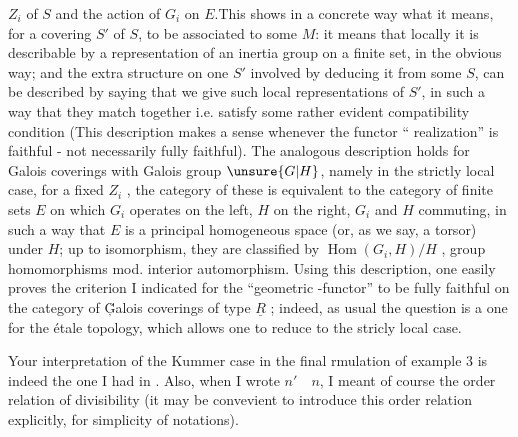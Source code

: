 $Z_i$ of $S$ and the action of $G_i$ on $E$.This shows in a  concrete way
what it means,  for a covering $S'$ of $S$, to be associated to some $M$: it
means that locally it is describable by a representation of an inertia
group on a finite set, in the obvious way; and the extra structure
on one $S'$ involved by deducing it from some $S$, can be described by
saying that we give such local representations of $S'$, in such a way
that they match together i.e. satisfy some rather evident compatibility
condition (This description makes a sense whenever the functor ``
realization'' is faithful - not necessarily fully faithful). The analogous
description holds for Galois coverings with Galois group $\unsure{G|H}$, namely
in the strictly local case, for a fixed $Z_i$ , the category of these is equivalent to the category of finite
sets $E$ on which $G_i$ operates on the left, $H$ on the right, $G_i$ and $H$ commuting,
in such a way that $E$ is a principal homogeneous space (or, as we
say, a torsor) under $H$; up to isomorphism, they are classified by
$\operatorname{Hom}(G_i,H)/H$ , group homomorphisms mod. interior automorphism. Using 
this description, one easily proves the criterion I indicated for the
``geometric -functor'' to be fully faithful on the category
of \c{\u{G}}alois coverings of type $\underline{R}$ ; indeed, as usual the question is a 
one for the étale topology, which allows one to  reduce to the
stricly local case.

Your interpretation of the Kummer case in the final rmulation
of example 3 is indeed the one I had in . Also, when I wrote $n'\quad n$,
I meant of course the order relation of divisibility (it may be convevient
to introduce this order relation explicitly, for simplicity of
notations).
